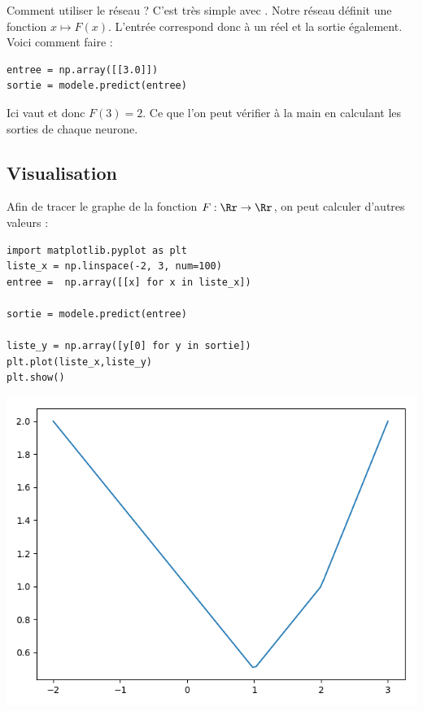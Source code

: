 \documentclass[11pt,class=report,crop=false]{standalone}
\begin{document}
Comment utiliser le réseau ? C'est très simple avec .
 Notre réseau définit une fonction $x \mapsto F(x)$. L'entrée correspond donc à un réel et la sortie également. Voici comment faire :
\begin{lstlisting}
entree = np.array([[3.0]])
sortie = modele.predict(entree)
\end{lstlisting}
Ici  vaut \ci{[[2.0]]} et donc 
$F(3) = 2$. Ce que l'on peut vérifier à la main en calculant les sorties de chaque neurone.



\subsection{Visualisation}
Afin de tracer le graphe de la fonction $F: \Rr \to \Rr$, on peut calculer d'autres valeurs :

\begin{minipage}{0.55\textwidth}
\begin{lstlisting}
import matplotlib.pyplot as plt
liste_x = np.linspace(-2, 3, num=100)
entree =  np.array([[x] for x in liste_x])

sortie = modele.predict(entree)

liste_y = np.array([y[0] for y in sortie])
plt.plot(liste_x,liste_y)
plt.show()
\end{lstlisting}
\end{minipage}
\begin{minipage}{0.4\textwidth}
\begin{center}
\includegraphics[scale=\myscale,scale=0.4]{figures/pythontf-keras-01}
\end{center}
\end{minipage}
\end{document}
